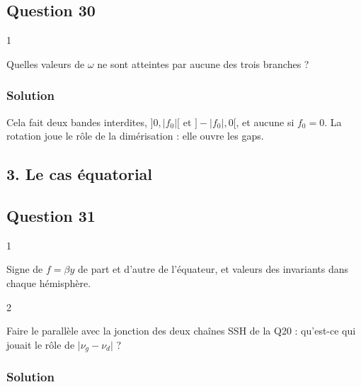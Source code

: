 \documentclass[11pt,a4paper]{article}
\newcommand{\equationajustee}[1]{%
  \sbox{\boiteequation}{$\displaystyle #1$}%
  \ifdim\wd\boiteequation>\linewidth
    \[\resizebox{\linewidth}{!}{\usebox{\boiteequation}}\]%
  \else
    \[#1\]%
  \fi}
\begin{document}
\hypertarget{question-30}{%
\subsection{Question 30}\label{question-30}}

\begin{indication}{1}

Quelles valeurs de \(\omega\) ne sont atteintes par aucune des trois branches ?

\end{indication}

\hypertarget{solution-38}{%
\subsubsection{Solution}\label{solution-38}}

\equationajustee{\boxed{0<\lvert\omega\rvert<\lvert f_0\rvert}}

Cela fait deux bandes interdites, \(]0,\lvert f_0\rvert[\) et \(]-\lvert f_0\rvert,0[\), et aucune si \(f_0=0\). La rotation joue le rôle de la dimérisation : elle ouvre les gaps.

\hypertarget{le-cas-uxe9quatorial}{%
\subsection{3. Le cas équatorial}\label{le-cas-uxe9quatorial}}

\hypertarget{question-31}{%
\subsection{Question 31}\label{question-31}}

\begin{indication}{1}

Signe de \(f=\beta y\) de part et d'autre de l'équateur, et valeurs des invariants dans chaque hémisphère.

\end{indication}

\begin{indication}{2}

Faire le parallèle avec la jonction des deux chaînes SSH de la Q20 : qu'est-ce qui jouait le rôle de \(\lvert\nu_g-\nu_d\rvert\) ?

\end{indication}

\hypertarget{solution-39}{%
\subsubsection{Solution}\label{solution-39}}
\end{document}

